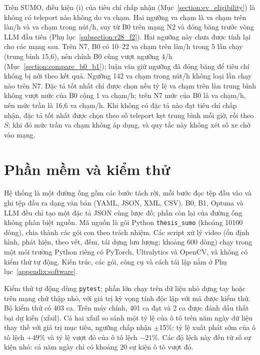 \documentclass[../main.tex]{subfiles}
\begin{document}
Trên SUMO, điều kiện (i) của tiêu chí chấp nhận (Mục~\ref{section:ev_eligibility}) là không có teleport nào không do va chạm. Hai ngưỡng va chạm là  va chạm trên làn/h và  va chạm trong nút/h, suy từ B0 trên mạng N2 và đóng băng trước vòng LLM đầu tiên (Phụ lục~\ref{subsection:r28_f2}). Hai ngưỡng này chưa được tính lại cho các mạng sau. Trên N7, B0 có 10--22 va chạm trên làn/h trong 5 lần chạy (trung bình 15,6), nên chính B0 cũng vượt ngưỡng 4/h (Mục~\ref{section:compare_b0_b1}); luận văn giữ ngưỡng đã đóng băng để tiêu chí không bị nới theo kết quả. Ngưỡng 142 va chạm trong nút/h không loại lần chạy nào trên N7. Đặc tả tốt nhất chỉ được chọn nếu tỷ lệ va chạm trên làn trung bình không vượt mức của B0 cộng 1 va chạm/h; trên N7 mức của B0 là  va chạm/h, nên mức trần là 16,6 va chạm/h. Khi không có đặc tả nào đạt tiêu chí chấp nhận, đặc tả tốt nhất được chọn theo số teleport kẹt trung bình mỗi giờ, rồi theo $S$; khi đó mức trần va chạm không áp dụng, và quy tắc này không xét số xe chờ vào mạng.

\section{Phần mềm và kiểm thử}
\label{section:testing}

Hệ thống là một đường ống gồm các bước tách rời, mỗi bước đọc tệp đầu vào và ghi tệp đầu ra dạng văn bản (YAML, JSON, XML, CSV). B0, B1, Optuna và LLM đều chỉ tạo một đặc tả JSON cùng lược đồ; phần còn lại của đường ống không phân biệt nguồn. Mã nguồn là gói Python \texttt{thesis\_sumo} (khoảng 10100 dòng), chia thành các gói con theo trách nhiệm. Các script xử lý video (ổn định hình, phát hiện, theo vết, đếm, tái dựng lưu lượng; khoảng 600 dòng) chạy trong một môi trường Python riêng có PyTorch, Ultralytics và OpenCV, và không có kiểm thử tự động. Kiến trúc, các gói, công cụ và cách tái lập nằm ở Phụ lục~\ref{appendix:software}.

Kiểm thử tự động dùng \texttt{pytest}; phần lớn chạy trên dữ liệu nhỏ dựng tay hoặc trên mạng chữ thập nhỏ, với giá trị kỳ vọng tính độc lập với mã được kiểm thử. Bộ kiểm thử có 403 ca. Trên máy chính, 401 ca đạt và 2 ca được đánh dấu thất bại dự kiến (xfail). Cả hai xfail so sánh một tỷ lệ của ô tô trên năm ngày dữ liệu thay thế với giá trị mục tiêu, ngưỡng chấp nhận $\pm$15\%: tỷ lệ xuất phát sớm của ô tô lệch $+49\%$ và tỷ lệ vượt đỏ của ô tô lệch $-21\%$. Các độ lệch này đến từ số sự kiện nhỏ: cả năm ngày chỉ có khoảng 20 sự kiện ô tô vượt đỏ.
\end{document}
